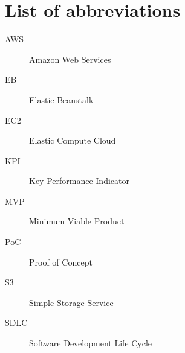 \chapter{List of abbreviations}

\begin{description}
	\item[AWS] Amazon Web Services
	\item[EB] Elastic Beanstalk
	\item[EC2] Elastic Compute Cloud
	\item[KPI] Key Performance Indicator
	\item[MVP] Minimum Viable Product
	\item[PoC] Proof of Concept
	\item[S3] Simple Storage Service
	\item[SDLC] Software Development Life Cycle
\end{description}
	